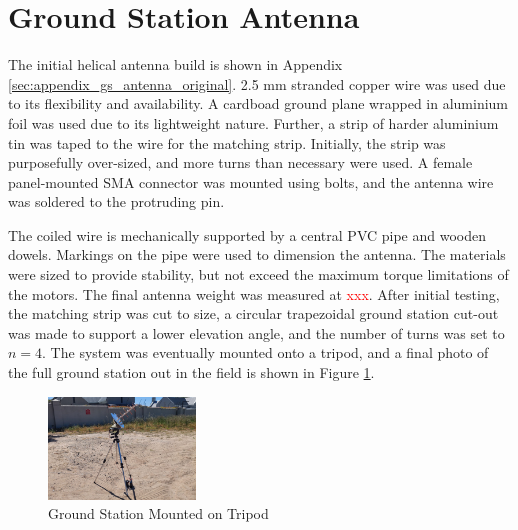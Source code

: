 \graphicspath{{./figures}}

\section{Ground Station Antenna}

The initial helical antenna build is shown in Appendix \ref{sec:appendix_gs_antenna_original}. 2.5 mm stranded copper wire was used due to its flexibility and availability. A cardboad ground plane wrapped in aluminium foil was used due to its lightweight nature. Further, a strip of harder aluminium tin was taped to the wire for the matching strip. Initially, the strip was purposefully over-sized, and more turns than necessary were used. A female panel-mounted SMA connector was mounted using bolts, and the antenna wire was soldered to the protruding pin.

The coiled wire is mechanically supported by a central PVC pipe and wooden dowels. Markings on the pipe were used to dimension the antenna. The materials were sized to provide stability, but not exceed the maximum torque limitations of the motors. The final antenna weight was measured at \textcolor{red}{xxx}. After initial testing, the matching strip was cut to size, a circular trapezoidal ground station cut-out was made to support a lower elevation angle, and the number of turns was set to $n=4$. The system was eventually mounted onto a tripod, and a final photo of the full ground station out in the field is shown in Figure \ref{fig:gsTripod}.

\begin{figure}[!htb]
  \centering
  \includegraphics[width=0.35\textwidth]{gsTripod}
  \caption{Ground Station Mounted on Tripod}
  \label{fig:gsTripod}
\end{figure}